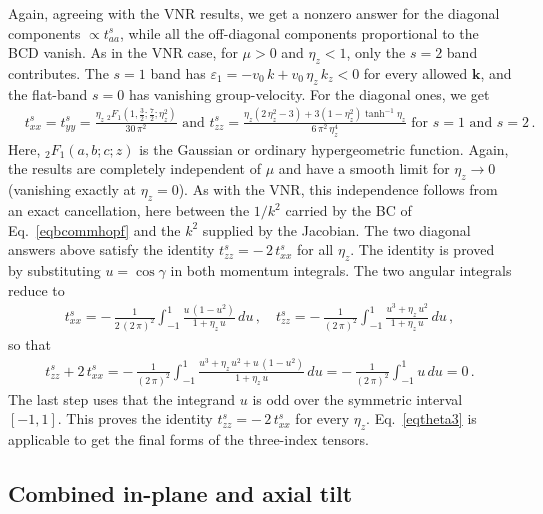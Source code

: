 \documentclass[aps,prb,onecolumn,nofootinbib,citeautoscript,10pt]{revtex4-2}
\newcommand{\bs}[1]{\boldsymbol{#1}}
\begin{document}
Again, agreeing with the VNR results, we get a nonzero answer for the diagonal components $\propto t^s_{aa}$, while all the off-diagonal components proportional to the BCD vanish. As in the VNR case, for $\mu > 0$ and $\eta_z < 1$, only the $s=2$ band contributes. The $s=1$ band has $\varepsilon_1 = -v_0\,k + v_0\,\eta_z\,k_z < 0$ for every allowed $\bs k$, and the flat-band $s=0$ has vanishing group-velocity. For the diagonal ones, we get
\begin{align}
& t^s_{xx} = t^s_{yy} = 
\frac{\eta _z \; _2F_1\left(1,\frac{3}{2};\frac{7}{2};\eta _z^2\right)} {30\, \pi ^2}
\text{ and }
t^s_{zz} = \frac{\eta _z \left(2 \,\eta _z^2-3\right)+3 \left( 1- \eta _z^2\right) 
\tanh ^{-1} \eta _z} {6 \, \pi ^2 \, \eta _z^4}
 \text{ for } s=1 \text{ and } s=2\,.
\end{align}
Here, $ _2F_1(a, b; c; z) $ is the Gaussian or ordinary hypergeometric function. Again, the results are completely independent of $\mu$ and have a smooth limit for $\eta_z \rightarrow  0 $ (vanishing exactly at $\eta_z  =  0$). As with the VNR, this independence follows from an exact cancellation, here between the $1/k^2$ carried by the BC of Eq.~\eqref{eqbcommhopf} and the $k^2$ supplied by the Jacobian.
The two diagonal answers above satisfy the identity $t^s_{zz}=-\,2\,t^s_{xx}$ for all $\eta_z$. The identity is proved by substituting $u = \cos \gamma$ in both momentum integrals. The two angular integrals reduce to
\begin{align}
t^s_{xx} = -\,\frac{1}{2\,(2\,\pi)^2}
\int_{-1}^{1} \frac{u\,(1-u^2)}{1+\eta_z \,u}\,du\,, \quad
t^s_{zz} = -\,\frac{1}{(2\,\pi)^2}
\int_{-1}^{1} \frac{u^3 + \eta_z \,u^2}{1+\eta_z \,u}\,du\,,
\end{align}
so that
\begin{align}
t^s_{zz} + 2\,t^s_{xx} = -\,\frac{1}{(2\,\pi)^2}
\int_{-1}^{1} \frac{u^3 + \eta_z \,u^2 + u\,(1-u^2)}{1+\eta_z \,u}\,du
= -\,\frac{1}{(2\,\pi)^2} \int_{-1}^{1} u\,du = 0\,.
\end{align}
The last step uses that the integrand $u$ is odd over the symmetric interval $[-1,1]$. This proves the identity $t^s_{zz}=-\,2\,t^s_{xx}$ for every $\eta_z$. Eq.~\eqref{eqtheta3} is applicable to get the final forms of the three-index tensors.




\subsection{\texorpdfstring{Combined in-plane and axial tilt}{Combined in-plane and axial tilt}}
\label{seccombined}
\end{document}
